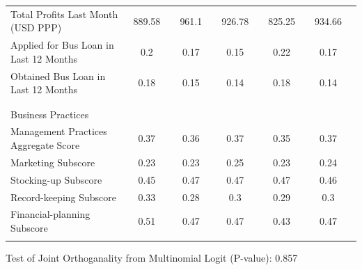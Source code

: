 \documentclass[hideothersubsections, usenames,dvipsnames,11pt]{beamer}
\newenvironment{itemize_3pt}{\itemize\addtolength{\itemsep}{3pt}}{\enditemize}
\begin{document}
\begin{frame}
{{\begin{table}
\begin{tabular}{l*{10}{c}}
Total Profits Last Month (USD PPP)						& 889.58	&& 961.1 &&	926.78	&& 825.25	&& 934.66 \\
Applied for Bus Loan in Last 12 Months
			    & 0.2	&& 0.17	&& 0.15	&& 0.22	&& 0.17 \\
													
Obtained Bus Loan in Last 12 Months
						& 0.18 &&	0.15	&& 0.14	&& 0.18	&& 0.14 \\[0.5ex]
\\
\\
\textcolor{bdf}{Business Practices} \\
Management Practices Aggregate Score											& 0.37	&& 0.36	&& 0.37	&& 0.35	&& 0.37 \\
\hspace{3mm}Marketing Subscore												& 0.23	&& 0.23 &&	0.25	&& 0.23	&& 0.24 \\
\hspace{3mm}Stocking-up	Subscore											& 0.45	&& 0.47	&& 0.47	&& 0.47	&& 0.46 \\
\hspace{3mm}Record-keeping Subscore											& 0.33	&& 0.28	&& 0.3	&& 0.29 &&	0.3 \\
\hspace{3mm}Financial-planning Subscore									& 0.51	&& 0.47	&& 0.47	&& 0.43	&& 0.47 \\
&		&&		&&		&& \\
		\hline
		\hline
			\end{tabular}
		
		
	\end{table}}}
\begin{itemize_3pt}
\item Test of Joint Orthoganality from Multinomial Logit (P-value): 0.857
\end{itemize_3pt}
\end{frame}
\end{document}
